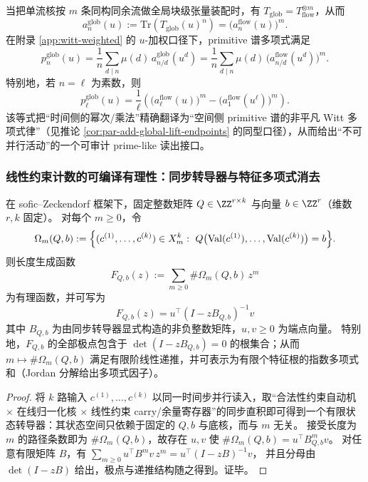 \begin{remark}
当把单流核按 $m$ 条同构同余流做全局块级张量装配时，有 $T_{\mathrm{glob}}=T_{\mathrm{flow}}^{\otimes m}$，从而
\[
a_n^{\mathrm{glob}}(u):=\mathrm{Tr}(T_{\mathrm{glob}}(u)^n)=\bigl(a_n^{\mathrm{flow}}(u)\bigr)^m.
\]
在附录 \ref{app:witt-weighted} 的 $u$-加权口径下，primitive 谱多项式满足
\[
p_n^{\mathrm{glob}}(u)=\frac{1}{n}\sum_{d\mid n}\mu(d)\,a_{n/d}^{\mathrm{glob}}(u^d)
=\frac{1}{n}\sum_{d\mid n}\mu(d)\,\bigl(a_{n/d}^{\mathrm{flow}}(u^d)\bigr)^m.
\]
特别地，若 $n=\ell$ 为素数，则
\[
p_\ell^{\mathrm{glob}}(u)=\frac{1}{\ell}\left(\bigl(a_\ell^{\mathrm{flow}}(u)\bigr)^m-\bigl(a_1^{\mathrm{flow}}(u^\ell)\bigr)^m\right).
\]
该等式把“时间侧的幂次/乘法”精确翻译为“空间侧 primitive 谱的非平凡 Witt 多项式律”（见推论 \ref{cor:par-add-global-lift-endpoints} 的同型口径），从而给出“不可并行活动”的一个可审计 prime-like 读出接口。
\end{remark}

\subsubsection{线性约束计数的可编译有理性：同步转导器与特征多项式消去}\label{subsec:compiled-linear-constraint-counting}

\begin{proposition}\label{prop:conclusion61-rational-gf-linear-constraints}
在 sofic--Zeckendorf 框架下，固定整数矩阵 \(Q\in\ZZ^{r\times k}\) 与向量 \(b\in\ZZ^r\)（维数 \(r,k\) 固定）。
对每个 \(m\ge 0\)，令
\[
\Omega_m(Q,b):=\Bigl\{(c^{(1)},\dots,c^{(k)})\in X_m^k:\ Q\bigl(\mathrm{Val}(c^{(1)}),\dots,\mathrm{Val}(c^{(k)})\bigr)=b\Bigr\}.
\]
则长度生成函数
\[
F_{Q,b}(z):=\sum_{m\ge 0} \#\Omega_m(Q,b)\,z^m
\]
为有理函数，并可写为
\[
\boxed{\;
F_{Q,b}(z)=u^\top(I-zB_{Q,b})^{-1}v\;}
\]
其中 \(B_{Q,b}\) 为由同步转导器显式构造的非负整数矩阵，\(u,v\ge 0\) 为端点向量。
特别地，\(F_{Q,b}\) 的全部极点包含于 \(\det(I-zB_{Q,b})=0\) 的根集合；从而 \(m\mapsto \#\Omega_m(Q,b)\) 满足有限阶线性递推，并可表示为有限个特征根的指数多项式和（Jordan 分解给出多项式因子）。
\end{proposition}

\begin{proof}
将 \(k\) 路输入 \(c^{(1)},\dots,c^{(k)}\) 以同一时间步并行读入，取“合法性约束自动机 \(\times\) 在线归一化核 \(\times\) 线性约束 carry/余量寄存器”的同步直积即可得到一个有限状态转导器：其状态空间只依赖于固定的 \(Q,b\) 与底核，而与 \(m\) 无关。
接受长度为 \(m\) 的路径条数即为 \(\#\Omega_m(Q,b)\)，故存在 \(u,v\) 使 \(\#\Omega_m(Q,b)=u^\top B_{Q,b}^m v\)。
对任意有限矩阵 \(B\)，有
\(
\sum_{m\ge 0}u^\top B^m v\,z^m=u^\top(I-zB)^{-1}v
\)，
并且分母由 \(\det(I-zB)\) 给出，极点与递推结构随之得到。证毕。
\end{proof}
